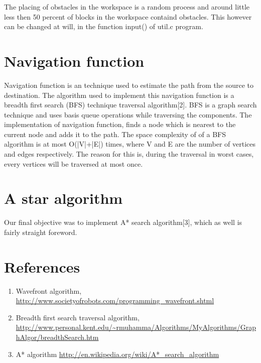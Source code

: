 \documentclass{report}
\begin{document}
	The placing of obstacles in the workspace is a random process and around little less then 50 percent of blocks in the workspace containd obstacles. This however can be changed at will, in the function \textsf{input()} of \textsf{util.c} program.

\section{Navigation function}
	Navigation function is an technique used to estimate the path from the source to destination. The algorithm used to implement this navigation function is a breadth first search (BFS) technique traversal algorithm[2]. BFS is a graph search technique and uses basis queue operations while traversing the components. The implementation of navigation function, finds a node which is nearest to the current node and adds it to the path. The space complexity of of a BFS algorithm is at most \textsf{O(|V|+|E|)} times, where V and E are the number of vertices and edges respectively. The reason for this is, during the traversal in worst cases, every vertices will be traversed at most once.


\section{A star algorithm}
	Our final objective was to implement A* search algorithm[3], which as well is fairly straight foreword.

\section{References}
	\begin{enumerate}
	\item Wavefront algorithm, \url{http://www.societyofrobots.com/programming_wavefront.shtml}
	\item Breadth first search traversal algorithm, \url{http://www.personal.kent.edu/~rmuhamma/Algorithms/MyAlgorithms/GraphAlgor/breadthSearch.htm}
	\item A* algorithm \url{http://en.wikipedia.org/wiki/A*_search_algorithm}
	\end{enumerate}
\end{document}
